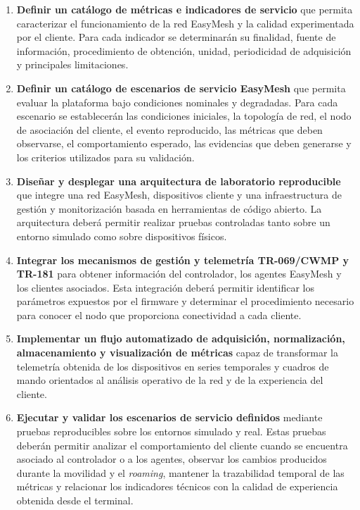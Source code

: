 \begin{enumerate}[
    label=\arabic*.,
    leftmargin=1.2cm,
    itemsep=0.4em,
    topsep=0.5em
]

    \item \textbf{Definir un catálogo de métricas e indicadores de
    servicio} que permita caracterizar el funcionamiento de la red
    EasyMesh y la calidad experimentada por el cliente. Para cada
    indicador se determinarán su finalidad, fuente de información,
    procedimiento de obtención, unidad, periodicidad de adquisición y
    principales limitaciones.

    \item \textbf{Definir un catálogo de escenarios de servicio
    EasyMesh} que permita evaluar la plataforma bajo condiciones
    nominales y degradadas. Para cada escenario se establecerán las
    condiciones iniciales, la topología de red, el nodo de asociación del
    cliente, el evento reproducido, las métricas que deben observarse, el
    comportamiento esperado, las evidencias que deben generarse y los
    criterios utilizados para su validación.

    \item \textbf{Diseñar y desplegar una arquitectura de laboratorio
    reproducible} que integre una red EasyMesh, dispositivos cliente y
    una infraestructura de gestión y monitorización basada en
    herramientas de código abierto. La arquitectura deberá permitir
    realizar pruebas controladas tanto sobre un entorno simulado como
    sobre dispositivos físicos.

    \item \textbf{Integrar los mecanismos de gestión y telemetría
    TR-069/CWMP y TR-181} para obtener información del controlador, los
    agentes EasyMesh y los clientes asociados. Esta integración deberá
    permitir identificar los parámetros expuestos por el firmware y
    determinar el procedimiento necesario para conocer el nodo que
    proporciona conectividad a cada cliente.

    \item \textbf{Implementar un flujo automatizado de adquisición,
    normalización, almacenamiento y visualización de métricas} capaz de
    transformar la telemetría obtenida de los dispositivos en series
    temporales y cuadros de mando orientados al análisis operativo de la
    red y de la experiencia del cliente.

    \item \textbf{Ejecutar y validar los escenarios de servicio
    definidos} mediante pruebas reproducibles sobre los entornos
    simulado y real. Estas pruebas deberán permitir analizar el
    comportamiento del cliente cuando se encuentra asociado al
    controlador o a los agentes, observar los cambios producidos durante
    la movilidad y el \textit{roaming}, mantener la trazabilidad temporal
    de las métricas y relacionar los indicadores técnicos con la calidad
    de experiencia obtenida desde el terminal.

\end{enumerate}

